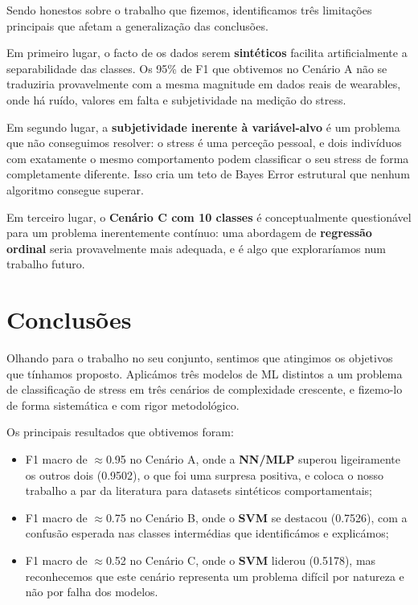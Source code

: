 \documentclass[12pt,a4paper]{article}
\begin{document}
Sendo honestos sobre o trabalho que fizemos, identificamos três limitações principais que
afetam a generalização das conclusões.

Em primeiro lugar, o facto de os dados serem \textbf{sintéticos} facilita artificialmente
a separabilidade das classes. Os 95\% de F1 que obtivemos no Cenário A não se traduziria
provavelmente com a mesma magnitude em dados reais de wearables, onde há ruído, valores
em falta e subjetividade na medição do stress.

Em segundo lugar, a \textbf{subjetividade inerente à variável-alvo} é um problema que não
conseguimos resolver: o stress é uma perceção pessoal, e dois indivíduos com exatamente
o mesmo comportamento podem classificar o seu stress de forma completamente diferente.
Isso cria um teto de Bayes Error estrutural que nenhum algoritmo consegue superar.

Em terceiro lugar, o \textbf{Cenário C com 10 classes} é conceptualmente questionável para
um problema inerentemente contínuo: uma abordagem de \textbf{regressão ordinal} seria
provavelmente mais adequada, e é algo que exploraríamos num trabalho futuro.

\section{Conclusões}

Olhando para o trabalho no seu conjunto, sentimos que atingimos os objetivos que tínhamos
proposto. Aplicámos três modelos de ML distintos a um problema de classificação de stress
em três cenários de complexidade crescente, e fizemo-lo de forma sistemática e com
rigor metodológico.

Os principais resultados que obtivemos foram:
\begin{itemize}
  \item F1 macro de $\approx$0.95 no Cenário A, onde a \textbf{NN/MLP} superou ligeiramente
    os outros dois (0.9502), o que foi uma surpresa positiva, e coloca o nosso trabalho
    a par da literatura para datasets sintéticos comportamentais;
  \item F1 macro de $\approx$0.75 no Cenário B, onde o \textbf{SVM} se destacou (0.7526),
    com a confusão esperada nas classes intermédias que identificámos e explicámos;
  \item F1 macro de $\approx$0.52 no Cenário C, onde o \textbf{SVM} liderou (0.5178),
    mas reconhecemos que este cenário representa um problema difícil por natureza e não
    por falha dos modelos.
\end{itemize}
\end{document}
